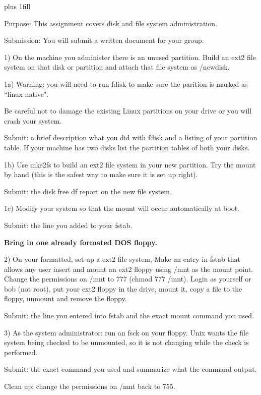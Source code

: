 
\rightskip=0pt plus 1fill

\parindent 0pt

Purpose: This assignment covers disk and file system administration.

Submission: You will submit a written document for your group.

1) On the machine you administer there is an unused 
partition.
Build an ext2 file system on that disk or partition and attach
that file system as {\ltt{}/newdisk}.

1a) Warning: you will need to run {\ltt{}fdisk} to make sure the parition
is marked as ``linux native".

Be careful not to damage the existing
Linux partitions on your drive or you will crash your system.

Submit: a brief description what you did with {\ltt{}fdisk} and
a listing of your partition table.
If your machine has two disks list the partition tables of both your disks.

1b) Use {\ltt{}mke2fs} to build an ext2 file system in your new partition.
Try the mount by hand (this is the safest way to make sure it is set
up right).

Submit: the disk free {\ltt{}df} report on the new file system.

1c) Modify your system so that the mount will 
occur automatically at boot.

Submit: the line you added to your {\ltt{}fstab}.

{\bf Bring in one already formated DOS floppy.}

2) On your formatted, set-up a ext2 file system,
Make an entry in {\ltt{}fstab} that allows any user insert and 
mount an ext2 floppy using {\ltt{}/mnt} as the mount point.
Change the permissions on {\ltt{}/mnt} to 777 ({\ltt{}chmod 777 /mnt}).
Login as yourself or bob (not root), put your ext2 floppy
in the drive,
mount it, copy a file to the floppy, unmount and remove the floppy.

Submit: the line you entered into {\ltt{}fstab} and
the exact mount command you used.

3) As the system administrator: run an {\ltt{}fsck} on your floppy. 
Unix wants the file system being checked to be unmounted, so it is not 
changing while the check is performed.

Submit: the exact command you used and summarize what the command output.

Clean up: change the permissions on {\ltt{}/mnt} back to 755.

\bye

